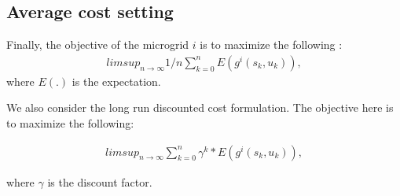 \subsection{Average cost setting}
Finally, the objective of the microgrid $i$ is to maximize the following \cite{avgcost}:
\begin{align}
limsup_{n \rightarrow \infty} 1/n \sum_{k = 0}^{n} E(g^{i}(s_{k},u_{k})),
\end{align}
where $E(.)$ is the expectation. 

We also consider the long run discounted cost formulation. The objective here is to maximize the following:

\begin{align}
limsup_{n \rightarrow \infty} \sum_{k = 0}^{n} \gamma^{k} * E(g^{i}(s_{k},u_{k})),
\end{align}

where $\gamma$ is the discount factor. 

